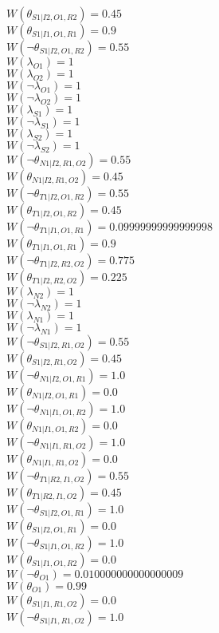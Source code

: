 $W(\theta_{S1|I2,O1,R2})=0.45$\\
$W(\theta_{S1|I1,O1,R1})=0.9$\\
$W(\neg\theta_{S1|I2,O1,R2})=0.55$\\
$W(\lambda_{O1})=1$\\
$W(\lambda_{O2})=1$\\
$W(\neg\lambda_{O1})=1$\\
$W(\neg\lambda_{O2})=1$\\
$W(\lambda_{S1})=1$\\
$W(\neg\lambda_{S1})=1$\\
$W(\lambda_{S2})=1$\\
$W(\neg\lambda_{S2})=1$\\
$W(\neg\theta_{N1|I2,R1,O2})=0.55$\\
$W(\theta_{N1|I2,R1,O2})=0.45$\\
$W(\neg\theta_{T1|I2,O1,R2})=0.55$\\
$W(\theta_{T1|I2,O1,R2})=0.45$\\
$W(\neg\theta_{T1|I1,O1,R1})=0.09999999999999998$\\
$W(\theta_{T1|I1,O1,R1})=0.9$\\
$W(\neg\theta_{T1|I2,R2,O2})=0.775$\\
$W(\theta_{T1|I2,R2,O2})=0.225$\\
$W(\lambda_{N2})=1$\\
$W(\neg\lambda_{N2})=1$\\
$W(\lambda_{N1})=1$\\
$W(\neg\lambda_{N1})=1$\\
$W(\neg\theta_{S1|I2,R1,O2})=0.55$\\
$W(\theta_{S1|I2,R1,O2})=0.45$\\
$W(\neg\theta_{N1|I2,O1,R1})=1.0$\\
$W(\theta_{N1|I2,O1,R1})=0.0$\\
$W(\neg\theta_{N1|I1,O1,R2})=1.0$\\
$W(\theta_{N1|I1,O1,R2})=0.0$\\
$W(\neg\theta_{N1|I1,R1,O2})=1.0$\\
$W(\theta_{N1|I1,R1,O2})=0.0$\\
$W(\neg\theta_{T1|R2,I1,O2})=0.55$\\
$W(\theta_{T1|R2,I1,O2})=0.45$\\
$W(\neg\theta_{S1|I2,O1,R1})=1.0$\\
$W(\theta_{S1|I2,O1,R1})=0.0$\\
$W(\neg\theta_{S1|I1,O1,R2})=1.0$\\
$W(\theta_{S1|I1,O1,R2})=0.0$\\
$W(\neg\theta_{O1})=0.010000000000000009$\\
$W(\theta_{O1})=0.99$\\
$W(\theta_{S1|I1,R1,O2})=0.0$\\
$W(\neg\theta_{S1|I1,R1,O2})=1.0$\\
